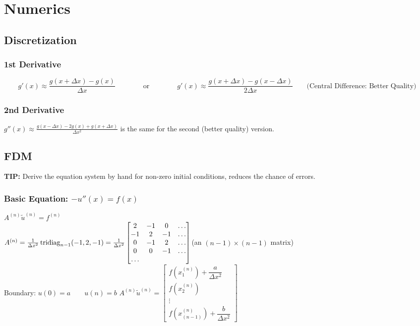

\section{Numerics}
\subsection{Discretization}
\subsubsection{1st Derivative}

$$g'(x)\approx \frac{g(x+\Delta x)-g(x)}{\Delta x} \qquad\qquad \text{or}
\qquad\qquad \boxed{g'(x)\approx \frac{g(x+\Delta x)-g(x-\Delta x)}{2\Delta
x}}\qquad \text{(Central Difference: Better Quality)}$$

\subsubsection{2nd Derivative}
$\boxed{g''(x)\approx \frac{g(x-\Delta x)-2 g(x) + g(x+ \Delta x)}{\Delta x^2}}$ is the same for the second (better quality) version.

\subsection{FDM}
\textbf{TIP:} Derive the equation system by hand for non-zero initial conditions, reduces the chance of errors.
\subsubsection{Basic Equation: $-u''(x)=f(x)$}
$ A^{(n)} \tilde{u}^{(n)} =f^{(n)}   $\\
$A^{(n)}= \frac{1}{\Delta x^2} \operatorname{tridiag}_{n-1} (-1,2,-1) = \frac{1}{\Delta x^2}
  \begin{bmatrix}
             2& -1 & 0 & \ldots \\
             -1& 2 & -1 & \ldots \\
              0& -1 & 2 & \ldots \\
              0& 0 & -1 & \ldots \\
             \ldots
           \end{bmatrix}$\qquad (an $(n-1)\times(n-1)$ matrix)\\
Boundary: $u(0)= a \qquad u(n)=b $ \qquad
$A^{(n)}\tilde{u}^{(n)} =\begin{bmatrix}
             f(x_1^{(n)}) + \dfrac{a}{\Delta x^2} \\
             f(x_2^{(n)}) \\
             \vdots  \\
             f(x_{(n-1)}^{(n)}) + \dfrac{b}{\Delta x^2}
           \end{bmatrix} $\\

